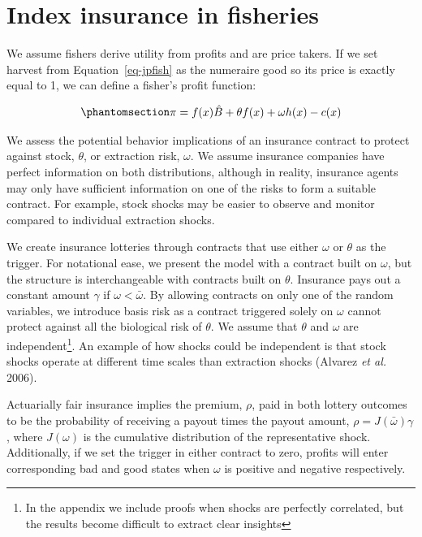 \documentclass[
  letterpaper,
  DIV=11,
  numbers=noendperiod]{scrartcl}
\theoremstyle{plain}
\theoremstyle{plain}
\theoremstyle{remark}
\begin{document}
\section{Index insurance in fisheries}\label{sec-common}

We assume fishers derive utility from profits and are price takers. If
we set harvest from Equation~\ref{eq-jpfish} as the numeraire good so
its price is exactly equal to 1, we can define a fisher's profit
function:

\begin{equation}\phantomsection\label{eq-pi1}{
\begin{aligned}
\pi=f(x)\hat{B}+\theta f(x)+\omega h(x)-c(x)
\end{aligned}
}\end{equation}

We assess the potential behavior implications of an insurance contract
to protect against stock, \(\theta\), or extraction risk, \(\omega\). We
assume insurance companies have perfect information on both
distributions, although in reality, insurance agents may only have
sufficient information on one of the risks to form a suitable contract.
For example, stock shocks may be easier to observe and monitor compared
to individual extraction shocks.

We create insurance lotteries through contracts that use either
\(\omega\) or \(\theta\) as the trigger. For notational ease, we present
the model with a contract built on \(\omega\), but the structure is
interchangeable with contracts built on \(\theta\). Insurance pays out a
constant amount \(\gamma\) if \(\omega<\bar \omega\). By allowing
contracts on only one of the random variables, we introduce basis risk
as a contract triggered solely on \(\omega\) cannot protect against all
the biological risk of \(\theta\). We assume that \(\theta\) and
\(\omega\) are independent\footnote{In the appendix we include proofs
  when shocks are perfectly correlated, but the results become difficult
  to extract clear insights}. An example of how shocks could be
independent is that stock shocks operate at different time scales than
extraction shocks (Alvarez \emph{et al.} 2006).

Actuarially fair insurance implies the premium, \(\rho\), paid in both
lottery outcomes to be the probability of receiving a payout times the
payout amount, \(\rho=J(\bar \omega)\gamma\), where \(J(\omega)\) is the
cumulative distribution of the representative shock. Additionally, if we
set the trigger in either contract to zero, profits will enter
corresponding bad and good states when \(\omega\) is positive and
negative respectively.
\end{document}
